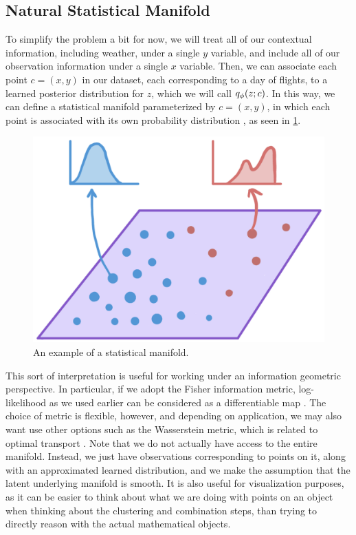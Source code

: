 \subsection{Natural Statistical Manifold}

To simplify the problem a bit for now, we will treat all of our contextual information, including weather, under a single $y$ variable, and include all of our observation information under a single $x$ variable. Then, we can associate each point $c=(x,y)$ in our dataset, each corresponding to a day of flights, to a learned posterior distribution for $z$, which we will call $\qvd{z;c}$. In this way, we can define a statistical manifold parameterized by $c=(x,y)$, in which each point is associated with its own probability distribution \cite{Matsuzoe_2010}, as seen in \cref{fig:example-statistical-manifold}.

\begin{figure}[htb!]
    \centering
    \includegraphics[width=0.5\linewidth]{media/example-statistical-manifold.png}
    \caption{An example of a statistical manifold.}
    \label{fig:example-statistical-manifold}
\end{figure}


This sort of interpretation is useful for working under an information geometric perspective. In particular, if we adopt the Fisher information metric, log-likelihood as we used earlier can be considered as a differentiable map \cite{Murray_Rice_1993}. The choice of metric is flexible, however, and depending on application, we may also want use other options such as the Wasserstein metric, which is related to optimal transport \cite{bigot2019statisticaldataanalysiswasserstein}. Note that we do not actually have access to the entire manifold. Instead, we just have observations corresponding to points on it, along with an approximated learned distribution, and we make the assumption that the latent underlying manifold is smooth. It is also useful for visualization purposes, as it can be easier to think about what we are doing with points on an object when thinking about the clustering and combination steps, than trying to directly reason with the actual mathematical objects. 

